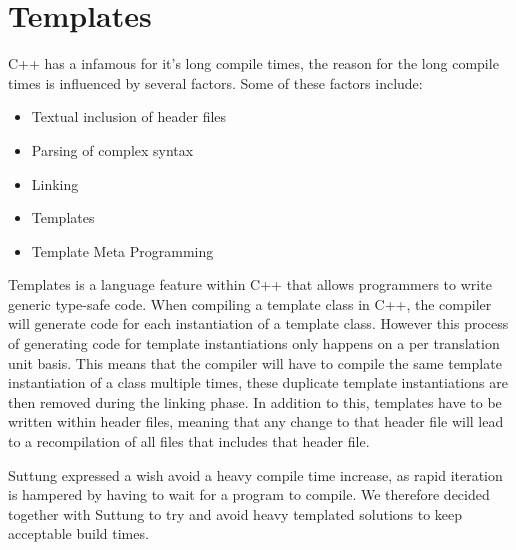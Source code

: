 \section{Templates}
C++ has a infamous for it's long compile times, the reason for the long compile times is influenced by several factors.
\cite{stack_overflow_why_does_cpp_compilation_take_so_long}
Some of these factors include:
\begin{itemize}
    \item
    Textual inclusion of header files

    \item
    Parsing of complex syntax

    \item
    Linking

    \item
    Templates

    \item
    Template Meta Programming
\end{itemize}

Templates is a language feature within C++ that allows programmers to write generic type-safe code.
When compiling a template class in C++, the compiler will generate code for each instantiation of
a template class.
However this process of generating code for template instantiations only happens on a per translation unit basis.
This means that the compiler will have to compile the same template instantiation of a class multiple times,
these duplicate template instantiations are then removed during the linking phase.
In addition to this, templates have to be written within header files,
meaning that any change to that header file will lead to a recompilation of all files that includes that header file.
\cite{dr_dobbs_cpp_compilation_speed}

Suttung expressed a wish avoid a heavy compile time increase, as rapid iteration is hampered by having to wait for a program to compile.
We therefore decided together with Suttung to try and avoid heavy templated solutions to keep acceptable build times.
